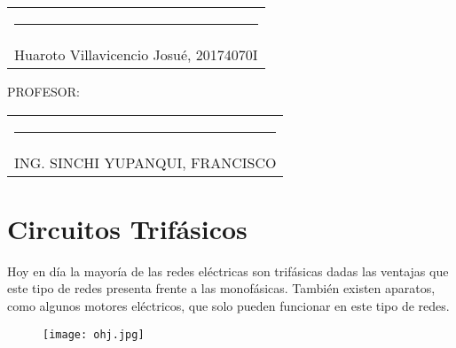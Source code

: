 \documentclass[a4paper,12pt]{report}
\begin{document}
\begin{center}
\begin{tabular}{c}
\rule[1pt]{3.14in}{1pt}\\
Huaroto Villavicencio Josué, 20174070I \\[2.5cm]
\end{tabular}
\end{center}
{\large PROFESOR:} \\[2cm]
\begin{center}
\begin{tabular}{c}
\rule[3pt]{4.8in}{1pt}\\[1pt]
ING. SINCHI YUPANQUI, FRANCISCO 
\end{tabular}
\end{center}
\vfill
\newpage
{} %
\setcounter{page}{1}  %
\chapter{Circuitos Trifásicos}
Hoy en día la mayoría de las redes eléctricas son trifásicas dadas las ventajas que este tipo de redes presenta frente a las monofásicas. También existen aparatos, como algunos motores eléctricos, que solo pueden funcionar en este tipo de redes.
\begin{figure}[H]
\centering
\texttt{[image: ohj.jpg]}
\end{figure}
\end{document}

